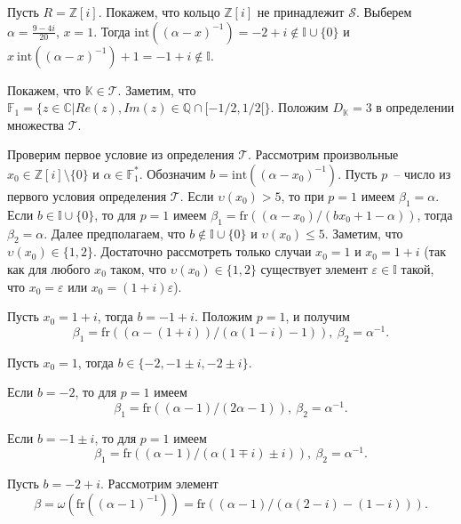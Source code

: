 \documentclass[_00_autoref.tex]{subfiles}
\begin{document}
\begin{example}\label{example:Z[i]}
    Пусть $R = \mathbb{Z}[i]$.
    Покажем, что кольцо $\mathbb{Z}[i]$ не принадлежит $\mathcal{S}.$
    Выберем $\alpha=\frac{9-4i}{20}$, $x=1$.
    Тогда $\textrm{int}((\alpha-x)^{-1})=-2+i \notin \mathbb{I} \cup \{0\}$ и $x \ \textrm{int}((\alpha-x)^{-1})+1=-1+i \notin \mathbb{I}.$

    Покажем, что $\mathbb{K}\in\mathcal{T}$.
    Заметим, что $\mathbb{F}_1=\{z\in\mathbb{C}|Re(z),Im(z)\in\mathbb{Q}\cap[-1/2,1/2[\}$.
    Положим $D_{\mathbb{K}}=3$ в определении множества $\mathcal{T}$.

    Проверим первое условие из определения $\mathcal{T}$.
    Рассмотрим произвольные $x_0\in\mathbb{Z}[i]\setminus\{0\}$ и $\alpha\in\mathbb{F}^*_1$.
    Обозначим $b=\textrm{int}((\alpha-x_0)^{-1})$.
    Пусть $p$~-- число из первого условия определения $\mathcal{T}$.
    Если $\upsilon(x_0)>5$, то при $p=1$ имеем $\beta_1=\alpha$.
    Если $b\in\mathbb{I}\cup\{0\}$, то для $p=1$ имеем $\beta_1=\textrm{fr}((\alpha-x_0)/(bx_0+1-\alpha))$, тогда $\beta_2=\alpha$.
    Далее предполагаем, что $b\not\in\mathbb{I}\cup\{0\}$ и $\upsilon(x_0)\le 5$.
    Заметим, что $\upsilon(x_0)\in\{1,2\}$.
    Достаточно рассмотреть только случаи $x_0=1$ и $x_0=1+i$ (так как для любого $x_0$ таком, что $\upsilon(x_0)\in\{1,2\}$ существует элемент $\varepsilon\in\mathbb{I}$ такой, что $x_0=\varepsilon$ или $x_0=(1+i)\varepsilon$).

    Пусть $x_0=1+i$, тогда $b=-1+i$.
    Положим $p=1$, и получим
    \begin{equation*}
        \beta_1=\textrm{fr}((\alpha-(1+i))/(\alpha(1-i)-1)),\ \beta_2=\alpha^{-1}.
    \end{equation*}

    Пусть $x_0=1$, тогда $b\in\{-2,-1\pm i,-2\pm i\}$.

    Если $b=-2$, то для $p=1$ имеем
    \begin{equation*}
        \beta_1=\textrm{fr}((\alpha-1)/(2\alpha-1)),\ \beta_2=\alpha^{-1}.
    \end{equation*}

    Если $b=-1\pm i$, то для $p=1$ имеем
    \begin{equation*}
        \beta_1=\textrm{fr}((\alpha-1)/(\alpha(1\mp i)\pm i)),\ \beta_2=\alpha^{-1}.
    \end{equation*}

    Пусть $b=-2+i$. Рассмотрим элемент
    \begin{equation*}
        \beta=\omega(\textrm{fr}((\alpha-1)^{-1}))=\textrm{fr}((\alpha-1)/(\alpha(2-i)-(1-i))).
    \end{equation*}


\end{example}
\end{document}
